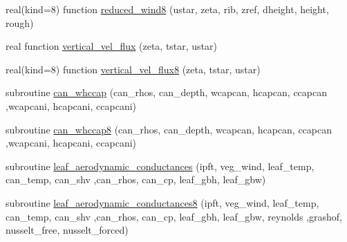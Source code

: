 \begin{DoxyCompactItemize}
\item 
real(kind=8) function \hyperlink{namespacecanopy__struct__dynamics_a4bfef6570fcebda5f22600fd0660ee0c}{reduced\+\_\+wind8} (ustar, zeta, rib, zref, dheight, height, rough)
\item 
real function \hyperlink{namespacecanopy__struct__dynamics_a126965a4161d05d71a5adbf82913401a}{vertical\+\_\+vel\+\_\+flux} (zeta, tstar, ustar)
\item 
real(kind=8) function \hyperlink{namespacecanopy__struct__dynamics_a146012cfe95a2719d6fbe6bf3589174d}{vertical\+\_\+vel\+\_\+flux8} (zeta, tstar, ustar)
\item 
subroutine \hyperlink{namespacecanopy__struct__dynamics_a21ac80bcc181629efe778e236edfa3b4}{can\+\_\+whccap} (can\+\_\+rhos, can\+\_\+depth, wcapcan, hcapcan, ccapcan                                                                                                                                                                                       ,wcapcani, hcapcani, ccapcani)
\item 
subroutine \hyperlink{namespacecanopy__struct__dynamics_aa8e69a84816d376ffc6d888df27932fe}{can\+\_\+whccap8} (can\+\_\+rhos, can\+\_\+depth, wcapcan, hcapcan, ccapcan                                                                                                                                                                                   ,wcapcani, hcapcani, ccapcani)
\item 
subroutine \hyperlink{namespacecanopy__struct__dynamics_a01dd30c6849ca1649aae28428c838730}{leaf\+\_\+aerodynamic\+\_\+conductances} (ipft, veg\+\_\+wind, leaf\+\_\+temp, can\+\_\+temp, can\+\_\+shv                                                                                                                                                                                               ,can\+\_\+rhos, can\+\_\+cp, leaf\+\_\+gbh, leaf\+\_\+gbw)
\item 
subroutine \hyperlink{namespacecanopy__struct__dynamics_a7cf5432807ae86932e2d3d6a0973a614}{leaf\+\_\+aerodynamic\+\_\+conductances8} (ipft, veg\+\_\+wind, leaf\+\_\+temp, can\+\_\+temp, can\+\_\+shv                                                                                                                                                                                               ,can\+\_\+rhos, can\+\_\+cp, leaf\+\_\+gbh, leaf\+\_\+gbw, reynolds                                                                                                                                                                                       ,grashof, nusselt\+\_\+free, nusselt\+\_\+forced)

\end{DoxyCompactItemize}
